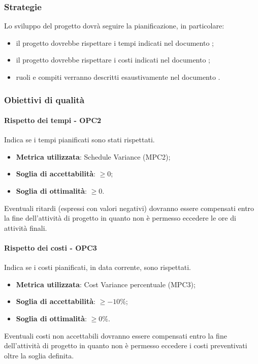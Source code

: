 \documentclass[PianoDiQualifica.tex]{subfiles}
\begin{document}
		\subsubsection{Strategie}
			Lo sviluppo del progetto dovrà seguire la pianificazione, in particolare:
			\begin{itemize}
				\item il progetto dovrebbe rispettare i tempi indicati nel documento \PPdocRP{};
				\item il progetto dovrebbe rispettare i costi indicati nel documento \PPdocRP{};
				\item ruoli e compiti verranno descritti esaustivamente nel documento \PPdocRP{}.
			\end{itemize}
		
		\subsubsection{Obiettivi di qualità}
			\paragraph{Rispetto dei tempi - OPC2}
				Indica se i tempi pianificati sono stati rispettati.
				\begin{itemize}
					\item \textbf{Metrica utilizzata}: Schedule Variance (MPC2);
					\item \textbf{Soglia di accettabilità}: \begin{math}\geq 0\end{math};
					\item \textbf{Soglia di ottimalità}: \begin{math}\geq 0\end{math}.
				\end{itemize}
				Eventuali ritardi (espressi con valori negativi) dovranno essere compensati entro la fine dell'attività di progetto
				in quanto non è permesso eccedere le ore di attività finali.
			
			\paragraph{Rispetto dei costi - OPC3}
				Indica se i costi pianificati, in data corrente, sono rispettati.
				\begin{itemize}
					\item \textbf{Metrica utilizzata}: Cost Variance percentuale (MPC3);
					\item \textbf{Soglia di accettabilità}: \begin{math}\geq -10\%\end{math};
					\item \textbf{Soglia di ottimalità}: \begin{math}\geq 0\%\end{math}.
				\end{itemize}
				Eventuali costi non accettabili dovranno essere compensati entro la fine dell'attività di progetto in quanto non è
				permesso eccedere i costi preventivati oltre la soglia definita.
			
\end{document}
